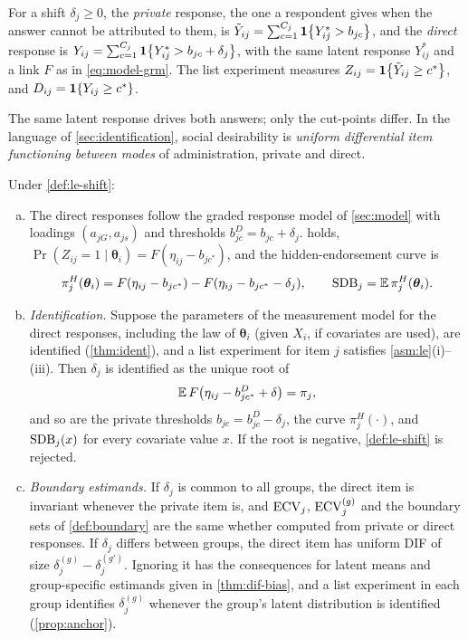 \begin{definition}\label{def:le-shift}
For a shift $\delta_j\ge0$, the \emph{private} response, the one a respondent gives when the answer cannot be attributed to them, is $\tilde Y_{ij}=\sum_{c=1}^{C_j}\mathbf{1}\!\left\{Y^*_{ij}>b_{jc}\right\}$, and the \emph{direct} response is $Y_{ij}=\sum_{c=1}^{C_j}\mathbf{1}\!\left\{Y^*_{ij}>b_{jc}+\delta_j\right\}$, with the same latent response $Y^*_{ij}$ and a link $F$ as in \eqref{eq:model-grm}. The list experiment measures $Z_{ij}=\mathbf{1}\!\left\{\tilde Y_{ij}\ge c^*\right\}$, and $D_{ij}=\mathbf{1}\!\left\{Y_{ij}\ge c^*\right\}$.
\end{definition}

The same latent response drives both answers; only the cut-points differ. In the language of \cref{sec:identification}, social desirability is \emph{uniform differential item functioning between modes} of administration, private and direct.

\begin{proposition}\label{prop:list-irt}
Under \cref{def:le-shift}:
\begin{enumerate}[(a)]
  \item The direct responses follow the graded response model of \cref{sec:model} with loadings $(a_{jG},a_{js})$ and thresholds $b^D_{jc}=b_{jc}+\delta_j$.  holds, $\Pr(Z_{ij}=1\mid\bm\theta_i)=F(\eta_{ij}-b_{jc^*})$, and the hidden-endorsement curve is
  \begin{equation}\label{eq:le-irt-eta}
    \pi^H_j(\bm\theta_i)=F(\eta_{ij}-b_{jc^*})-F(\eta_{ij}-b_{jc^*}-\delta_j),\qquad \mathrm{SDB}_j=\mathbb{E}\,\pi^H_j(\bm\theta_i).
  \end{equation}
  \item \emph{Identification.} Suppose the parameters of the measurement model for the direct responses, including the law of $\bm\theta_i$ (given $X_i$, if covariates are used), are identified (\cref{thm:ident}), and a list experiment for item $j$ satisfies \cref{asm:le}(i)--(iii). Then $\delta_j$ is identified as the unique root of
  \begin{equation}\label{eq:le-irt-root}
    \mathbb{E}\,F\bigl(\eta_{ij}-b^D_{jc^*}+\delta\bigr)=\pi_j ,
  \end{equation}
  and so are the private thresholds $b_{jc}=b^D_{jc}-\delta_j$, the curve $\pi^H_j(\cdot)$, and $\mathrm{SDB}_j(x)$ for every covariate value $x$. If the root is negative, \cref{def:le-shift} is rejected.
  \item \emph{Boundary estimands.} If $\delta_j$ is common to all groups, the direct item is invariant whenever the private item is, and $\mathrm{ECV}_j$, $\mathrm{ECV}^{(g)}_j$ and the boundary sets of \cref{def:boundary} are the same whether computed from private or direct responses. If $\delta_j$ differs between groups, the direct item has uniform DIF of size $\delta_j^{(g)}-\delta_j^{(g')}$. Ignoring it has the consequences for latent means and group-specific estimands given in \cref{thm:dif-bias}, and a list experiment in each group identifies $\delta_j^{(g)}$ whenever the group's latent distribution is identified (\cref{prop:anchor}).
\end{enumerate}
\end{proposition}

